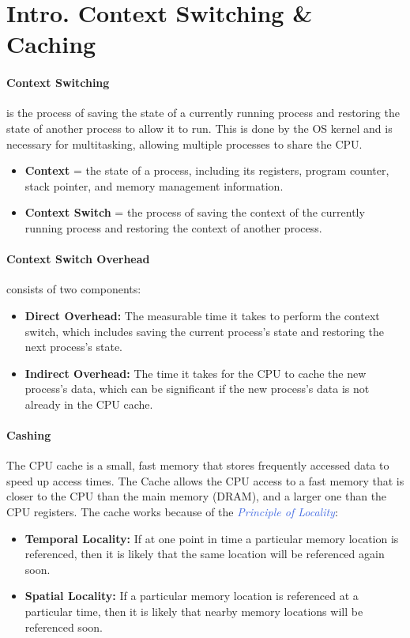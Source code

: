 \documentclass[openany,12pt]{book}
\newcommand{\blue}[1]{\textcolor{RoyalBlue}{#1}}
\begin{document}
\newpage
\section*{Intro. Context Switching \& Caching}
\paragraph{Context Switching} is the process of saving the state of a currently running process and restoring the state of another process to allow it to run. This is done by the OS kernel and is necessary for multitasking, allowing multiple processes to share the CPU.
\begin{itemize}
    \item \textbf{Context} = the state of a process, including its registers, program counter, stack pointer, and memory management information.
    \item \textbf{Context Switch} = the process of saving the context of the currently running process and restoring the context of another process.
\end{itemize}

\paragraph{Context Switch Overhead} consists of two components:
\begin{itemize}
    \item \textbf{Direct Overhead:} The measurable time it takes to perform the context switch, which includes saving the current process's state and restoring the next process's state.
    \item \textbf{Indirect Overhead:} The time it takes for the CPU to cache the new process's data, which can be significant if the new process's data is not already in the CPU cache.
\end{itemize}

\paragraph{Cashing} The CPU cache is a small, fast memory that stores frequently accessed data to speed up access times. The Cache allows the CPU access to a fast memory that is closer to the CPU than the main memory (DRAM), and a larger one than the CPU registers. The cache works because of the \blue{\textit{Principle of Locality}}:
\begin{itemize}
    \item \textbf{Temporal Locality:} If at one point in time a particular memory location is referenced, then it is likely that the same location will be referenced again soon.
    \item \textbf{Spatial Locality:} If a particular memory location is referenced at a particular time, then it is likely that nearby memory locations will be referenced soon.
\end{itemize}
\end{document}
